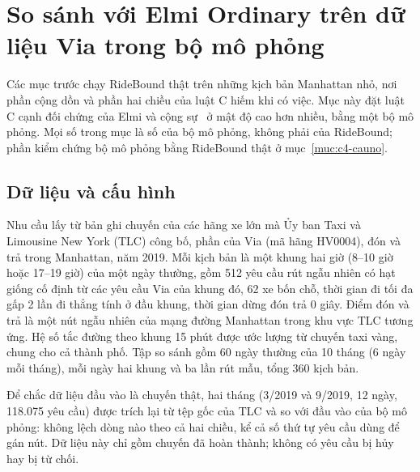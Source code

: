 \section{So sánh với Elmi Ordinary trên dữ liệu Via trong bộ mô phỏng}
\label{muc:c4-via}

Các mục trước chạy RideBound thật trên những kịch bản Manhattan nhỏ, nơi phần cộng dồn và phần hai chiều của luật C
hiếm khi có việc. Mục này đặt luật C cạnh đối chứng của Elmi và cộng sự~\cite{elmi2026} ở mật độ cao hơn nhiều, bằng một
bộ mô phỏng. Mọi số trong mục là số của bộ mô phỏng, không phải của RideBound; phần kiểm chứng bộ mô phỏng bằng RideBound
thật ở mục~\ref{muc:c4-cauno}.

\subsection{Dữ liệu và cấu hình}
\label{muc:c4-via-dulieu}

Nhu cầu lấy từ bản ghi chuyến của các hãng xe lớn mà Ủy ban Taxi và Limousine New York (TLC) công bố, phần của Via
(mã hãng HV0004), đón và trả trong Manhattan, năm 2019. Mỗi kịch bản là một khung hai giờ (8--10 giờ hoặc 17--19 giờ)
của một ngày thường, gồm 512 yêu cầu rút ngẫu nhiên có hạt giống cố định từ các yêu cầu Via của khung đó, 62 xe bốn chỗ,
thời gian đi tối đa gấp 2 lần đi thẳng tính ở đầu khung, thời gian dừng đón trả 0 giây. Điểm đón và trả là một nút ngẫu
nhiên của mạng đường Manhattan trong khu vực TLC tương ứng. Hệ số tắc đường theo khung 15 phút được ước lượng từ chuyến
taxi vàng, chung cho cả thành phố. Tập so sánh gồm 60 ngày thường của 10 tháng (6 ngày mỗi tháng), mỗi ngày hai khung và
ba lần rút mẫu, tổng 360 kịch bản.

Để chắc dữ liệu đầu vào là chuyến thật, hai tháng (3/2019 và 9/2019, 12 ngày, 118.075 yêu cầu) được trích lại từ tệp
gốc của TLC và so với đầu vào của bộ mô phỏng: không lệch dòng nào theo cả hai chiều, kể cả số thứ tự yêu cầu dùng để
gán nút. Dữ liệu này chỉ gồm chuyến đã hoàn thành; không có yêu cầu bị hủy hay bị từ chối.

